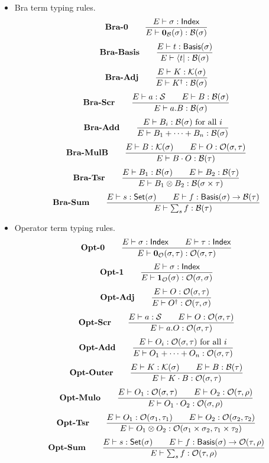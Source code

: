 \begin{itemize}
    \item Bra term typing rules.
    \[
        \textbf{Bra-0} \qquad
        \frac{E \vdash \sigma : \mathsf{Index}}{E \vdash \mathbf{0}_\mathcal{B}(\sigma) : \mathcal{B}(\sigma)}
    \]
    \[
        \textbf{Bra-Basis} \qquad
        \frac{E\vdash t : \mathsf{Basis}(\sigma)}{E \vdash \bra{t} : \mathcal{B}(\sigma)}
    \]
    \[
        \textbf{Bra-Adj} \qquad
        \frac{E \vdash K : \mathcal{K}(\sigma)}{E \vdash K^\dagger : \mathcal{B}(\sigma)}
    \]
    \[
        \textbf{Bra-Scr} \qquad
        \frac{E \vdash a : \mathcal{S} \qquad E \vdash B : \mathcal{B}(\sigma)}{E \vdash a.B : \mathcal{B}(\sigma)}
    \]
    \[
        \textbf{Bra-Add} \qquad
        \frac{E \vdash B_i : \mathcal{B}(\sigma) \text{ for all $i$}}{E \vdash B_1 + \cdots + B_n : \mathcal{B}(\sigma)}
    \]
    \[
        \textbf{Bra-MulB} \qquad
        \frac{E \vdash B : \mathcal{K}(\sigma) \qquad E \vdash O : \mathcal{O}(\sigma, \tau)}{E \vdash B \cdot O : \mathcal{B}(\tau)}
    \]
    \[
        \textbf{Bra-Tsr} \qquad
        \frac{E \vdash B_1 : \mathcal{B}(\sigma) \qquad E \vdash B_2 : \mathcal{B}(\tau)} {E \vdash B_1 \otimes B_2 : \mathcal{B}(\sigma \times \tau)}
    \]
    \[
        \textbf{Bra-Sum} \qquad
        \frac{E \vdash s : \mathsf{Set}(\sigma) \qquad E \vdash f : \mathsf{Basis}(\sigma) \to \mathcal{B}(\tau)}{E \vdash \sum_{s} f : \mathcal{B}(\tau)}
    \]

    \item Operator term typing rules.
    \[
        \textbf{Opt-0} \qquad
        \frac{E \vdash \sigma : \mathsf{Index} \qquad E \vdash \tau : \mathsf{Index}}{E \vdash \mathbf{0}_\mathcal{O}(\sigma, \tau) : \mathcal{O}(\sigma, \tau)}
    \]
    \[
        \textbf{Opt-1} \qquad
        \frac{E \vdash \sigma : \mathsf{Index}}{E \vdash \mathbf{1}_\mathcal{O}(\sigma) : \mathcal{O}(\sigma, \sigma)}
    \]
    \[
        \textbf{Opt-Adj} \qquad
        \frac{E \vdash O : \mathcal{O}(\sigma, \tau)}{E \vdash O^\dagger : \mathcal{O}(\tau, \sigma)}
    \]
    \[
        \textbf{Opt-Scr} \qquad
        \frac{E \vdash a : \mathcal{S} \qquad E \vdash O : \mathcal{O}(\sigma, \tau)}{E \vdash a.O : \mathcal{O}(\sigma, \tau)}
    \]
    \[
        \textbf{Opt-Add} \qquad
        \frac{E \vdash O_i : \mathcal{O}(\sigma, \tau) \text{ for all $i$}}{E \vdash O_1 + \cdots + O_n : \mathcal{O}(\sigma, \tau)}
    \]
    \[
        \textbf{Opt-Outer} \qquad
        \frac{E\vdash K : \mathcal{K}(\sigma) \qquad E\vdash B : \mathcal{B}(\tau)}{E\vdash K \cdot B : \mathcal{O}(\sigma, \tau)}
    \]
    \[
        \textbf{Opt-Mulo} \qquad
        \frac{E \vdash O_1 : \mathcal{O}(\sigma, \tau) \qquad E \vdash O_2 : \mathcal{O}(\tau, \rho)}{E \vdash O_1 \cdot O_2 : \mathcal{O}(\sigma, \rho)}
    \]
    \[
        \textbf{Opt-Tsr} \qquad
        \frac{E \vdash O_1 : \mathcal{O}(\sigma_1, \tau_1) \qquad E \vdash O_2 : \mathcal{O}(\sigma_2, \tau_2)} {E \vdash O_1 \otimes O_2 : \mathcal{O}(\sigma_1 \times \sigma_2, \tau_1 \times \tau_2)}
    \]
    \[
        \textbf{Opt-Sum} \qquad
        \frac{E \vdash s : \mathsf{Set}(\sigma) \qquad E \vdash f : \mathsf{Basis}(\sigma) \to \mathcal{O}(\tau, \rho)}{E \vdash \sum_{s} f : \mathcal{O}(\tau, \rho)}
    \]


\end{itemize}
